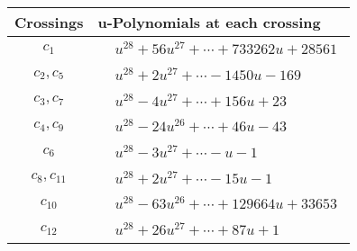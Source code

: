 \documentclass[1p]{elsarticle_modified}
\theoremstyle{definition}
\begin{document}
\begin{tabular}{m{50pt}|m{274pt}}
Crossings & \hspace{64pt}u-Polynomials at each crossing \\
\hline $$\begin{aligned}c_{1}\end{aligned}$$&$\begin{aligned}
&u^{28}+56 u^{27}+\cdots+733262 u+28561
\end{aligned}$\\
\hline $$\begin{aligned}c_{2},c_{5}\end{aligned}$$&$\begin{aligned}
&u^{28}+2 u^{27}+\cdots-1450 u-169
\end{aligned}$\\
\hline $$\begin{aligned}c_{3},c_{7}\end{aligned}$$&$\begin{aligned}
&u^{28}-4 u^{27}+\cdots+156 u+23
\end{aligned}$\\
\hline $$\begin{aligned}c_{4},c_{9}\end{aligned}$$&$\begin{aligned}
&u^{28}-24 u^{26}+\cdots+46 u-43
\end{aligned}$\\
\hline $$\begin{aligned}c_{6}\end{aligned}$$&$\begin{aligned}
&u^{28}-3 u^{27}+\cdots- u-1
\end{aligned}$\\
\hline $$\begin{aligned}c_{8},c_{11}\end{aligned}$$&$\begin{aligned}
&u^{28}+2 u^{27}+\cdots-15 u-1
\end{aligned}$\\
\hline $$\begin{aligned}c_{10}\end{aligned}$$&$\begin{aligned}
&u^{28}-63 u^{26}+\cdots+129664 u+33653
\end{aligned}$\\
\hline $$\begin{aligned}c_{12}\end{aligned}$$&$\begin{aligned}
&u^{28}+26 u^{27}+\cdots+87 u+1
\end{aligned}$\\
\hline
\end{tabular}\\~\\
\end{document}
